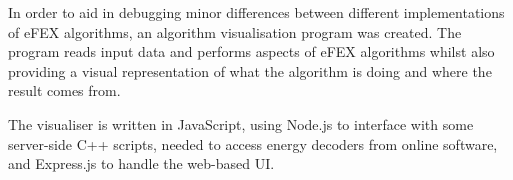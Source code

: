 In order to aid in debugging minor differences between different implementations
of \ac{eFEX} algorithms, an algorithm visualisation program was created.
%
The program reads input data and performs aspects of \ac{eFEX} algorithms whilst
also providing a visual representation of what the algorithm is doing and where
the result comes from.

The visualiser is written in JavaScript, using Node.js to interface with some
server-side C++ scripts, needed to access energy decoders from online software,
and Express.js to handle the web-based \ac{UI}.

